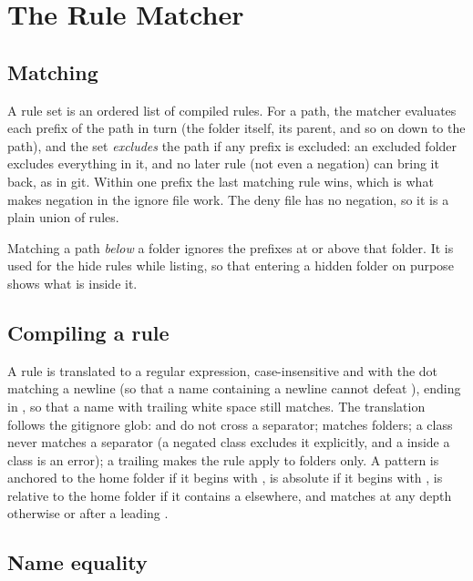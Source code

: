 \section{The Rule Matcher}
\label{sec:rulematcher}

\subsection{Matching}

A rule set is an ordered list of compiled rules.  For a path, the matcher evaluates
each prefix of the path in turn (the folder itself, its parent, and so on down to the
path), and the set \emph{excludes} the path if any prefix is excluded: an excluded
folder excludes everything in it, and no later rule (not even a negation) can bring it
back, as in git.  Within one prefix the last matching rule wins, which is what makes
negation in the ignore file work.  The deny file has no negation, so it is a plain
union of rules.

Matching a path \emph{below} a folder ignores the prefixes at or above that folder.  It is
used for the hide rules while listing, so that entering a hidden folder on purpose shows
what is inside it.

\subsection{Compiling a rule}

A rule is translated to a regular expression, case-insensitive and with the dot matching
a newline (so that a name containing a newline cannot defeat \code{**}), ending in
, so that a name with trailing white space still matches.  The
translation follows the gitignore glob: \code{*} and  do not cross a
separator; \code{**} matches folders; a class \code{[...]} never matches a separator
(a negated class excludes it explicitly, and a \code{/} inside a class is an error); a
trailing \code{/} makes the rule apply to folders only.  A pattern is anchored to the home
folder if it begins with \code{\~{}/}, is absolute if it begins with \code{/}, is relative
to the home folder if it contains a \code{/} elsewhere, and matches at any depth
otherwise or after a leading \code{**/}.

\subsection{Name equality}
\label{sec:fold}

